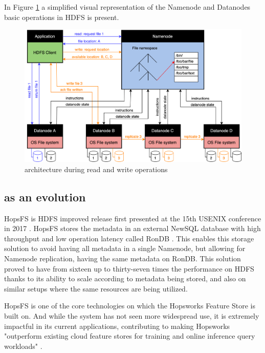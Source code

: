 In Figure \ref{fig:hdfs} a simplified visual representation of the Namenode and Datanodes basic operations in \gls{HDFS} is present.

\begin{figure}[!ht]
    \begin{center}
      \includegraphics[width=\textwidth]{figures/2-background/HDFS.png}
    \end{center}
    \caption{ architecture during read and write operations}
    \label{fig:hdfs}
\end{figure}
 
\subsection{ as an  evolution}

\gls{HopsFS} is \gls{HDFS} improved release first presented at the 15th USENIX conference in 2017 \cite{niaziHopsFSScalingHierarchical2017}. \gls{HopsFS} stores the metadata in an external NewSQL database with high throughput and low operation latency called RonDB \cite{LogicalclocksRondb2024}. This enables this storage solution to avoid having all metadata in a single Namenode, but allowing for Namenode replication, having the same metadata on RonDB. This solution proved to have from sixteen up to thirty-seven times the performance on \gls{HDFS} thanks to its ability to scale according to metadata being stored, and also on similar setups where the same resources are being utilized. 

\gls{HopsFS} is one of the core technologies on which the Hopsworks Feature Store is built on. And while the system has not seen more widespread use, it is extremely impactful in its current applications, contributing to making Hopsworks "outperform existing cloud feature stores for training and online inference query workloads" \cite{10.1145/3626246.3653389}. 

